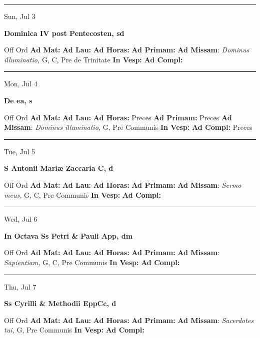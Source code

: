 \documentclass[letterpaper, 10pt]{article}
\begin{document}
\hrule
\begin{center}
Sun, Jul 3
\end{center}\textbf{ \large Dominica IV post Pentecosten, \textnormal{\normalsize sd}}
\begin{justify}
Off Ord
\textbf{Ad Mat: }
\textbf{Ad Lau: }
\textbf{Ad Horas: }
\textbf{Ad Primam: }
\textbf{Ad Missam}: \textit{Dominus illuminatio,} G, C, Pre de Trinitate
\textbf{In Vesp: }
\textbf{Ad Compl: }\end{justify}



\hrule
\begin{center}
Mon, Jul 4
\end{center}\textbf{ \large De ea, \textnormal{\normalsize s}}
\begin{justify}
Off Ord
\textbf{Ad Mat: }
\textbf{Ad Lau: }
\textbf{Ad Horas: }Preces
\textbf{Ad Primam: }Preces
\textbf{Ad Missam}: \textit{Dominus illuminatio,} G, Pre Communis
\textbf{In Vesp: }
\textbf{Ad Compl: }Preces\end{justify}



\hrule
\begin{center}
Tue, Jul 5
\end{center}\textbf{ \large S Antonii Mariæ Zaccaria C, \textnormal{\normalsize d}}
\begin{justify}
Off Ord
\textbf{Ad Mat: }
\textbf{Ad Lau: }
\textbf{Ad Horas: }
\textbf{Ad Primam: }
\textbf{Ad Missam}: \textit{Sermo meus,} G, C, Pre Communis
\textbf{In Vesp: }
\textbf{Ad Compl: }\end{justify}



\hrule
\begin{center}
Wed, Jul 6
\end{center}\textbf{ \large In Octava Ss Petri \& Pauli App, \textnormal{\normalsize dm}}
\begin{justify}
Off Ord
\textbf{Ad Mat: }
\textbf{Ad Lau: }
\textbf{Ad Horas: }
\textbf{Ad Primam: }
\textbf{Ad Missam}: \textit{Sapientiam,} G, C, Pre Communis
\textbf{In Vesp: }
\textbf{Ad Compl: }\end{justify}



\hrule
\begin{center}
Thu, Jul 7
\end{center}\textbf{ \large Ss Cyrilli \& Methodii EppCc, \textnormal{\normalsize d}}
\begin{justify}
Off Ord
\textbf{Ad Mat: }
\textbf{Ad Lau: }
\textbf{Ad Horas: }
\textbf{Ad Primam: }
\textbf{Ad Missam}: \textit{Sacerdotes tui,} G, Pre Communis
\textbf{In Vesp: }
\textbf{Ad Compl: }\end{justify}
\end{document}
